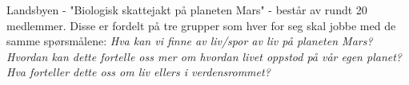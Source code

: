 Landsbyen - "Biologisk skattejakt på planeten Mars" - består av rundt 20 medlemmer.
Disse er fordelt på tre grupper som hver for seg skal jobbe med de samme spørsmålene\cite{kjellmo}:
{\textit{Hva kan vi finne av liv/spor av liv på planeten Mars?
Hvordan kan dette fortelle oss mer om hvordan livet oppstod på vår egen planet?
Hva forteller dette oss om liv ellers i verdensrommet?}}
